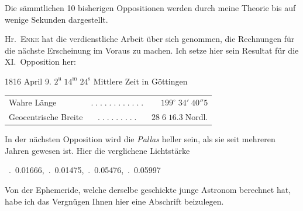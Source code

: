 \par\indent Die sämmtlichen 10 bisherigen Oppositionen werden durch meine Theorie bis auf wenige Sekunden dargestellt.

\par\indent Hr.\ \textsc{Enke} hat die verdienstliche Arbeit über sich genommen, die Rechnungen für die nächste Erscheinung im Voraus zu machen. Ich setze hier sein Resultat für die XI.\ Opposition her:

\begin{center}1816 April 9. $2^{\mathrm u}\;14^{\mathrm m}\;24^{\mathrm s}$ Mittlere Zeit in Göttingen\end{center}
\begin{center}\fontsize{10}{12}\selectfont\setlength{\tabcolsep}{3pt}\renewcommand{\arraystretch}{1.15}\begin{tabular}{lcr}
Wahre Länge & $.\;.\;.\;.\;.\;.\;.\;.\;.\;.\;.\;.$ & $199^\circ\;34'\;40''5$\\
Geocentrische Breite & $.\;.\;.\;.\;.\;.\;.\;.\;.$ & $28\;6\;16.3\;\text{Nordl.}$\\
\end{tabular}\end{center}

\par\indent In der nächsten Opposition wird die \emph{Pallas} heller sein, als sie seit mehreren Jahren gewesen ist. Hier die verglichene Lichtstärke

\begin{center}\fontsize{9}{11}\ .\ 0.01666,\ .\ 0.01475,\ .\ 0.05476,\ .\ 0.05997
\end{center}

\par\indent Von der Ephemeride, welche derselbe geschickte junge Astronom berechnet hat, habe ich das Vergnügen Ihnen hier eine Abschrift beizulegen.

